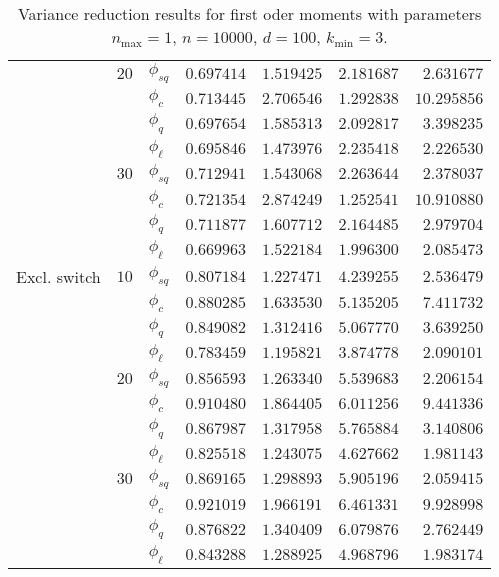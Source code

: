 \begin{table}[]
{\begin{tabular}{l@{\hskip 12pt}l@{\hskip 12pt}l@{\hskip 12pt}r@{\hskip 12pt}r@{\hskip 12pt}r@{\hskip 12pt}r}
            & $20$ &$\phi_{sq}$ &  $0.697414$ &  $1.519425$ &    $2.181687$ &   $2.631677$ \\
            &    &$\phi_{c}$ &  $0.713445$ &  $2.706546$ &    $1.292838$ &  $10.295856$ \\
            &    &$\phi_{q}$ &  $0.697654$ &  $1.585313$ &    $2.092817$ &   $3.398235$ \\
            &    & $\phi_{\ell}$ &  $0.695846$ &  $1.473976$ &    $2.235418$ &   $2.226530$ \\\cmidrule{2-7}
            & $30$ &$\phi_{sq}$ &  $0.712941$ &  $1.543068$ &    $2.263644$ &   $2.378037$ \\
            &    &$\phi_{c}$ &  $0.721354$ &  $2.874249$ &    $1.252541$ &  $10.910880$ \\
            &    &$\phi_{q}$ &  $0.711877$ &  $1.607712$ &    $2.164485$ &   $2.979704$ \\
            &    & $\phi_{\ell}$ &  $0.669963$ &  $1.522184$ &    $1.996300$ &   $2.085473$ \\\midrule
Excl. switch & $10$ &$\phi_{sq}$ &  $0.807184$ &  $1.227471$ &    $4.239255$ &   $2.536479$ \\
            &    &$\phi_{c}$ &  $0.880285$ &  $1.633530$ &    $5.135205$ &   $7.411732$ \\
            &    &$\phi_{q}$ &  $0.849082$ &  $1.312416$ &    $5.067770$ &   $3.639250$ \\
            &    & $\phi_{\ell}$ &  $0.783459$ &  $1.195821$ &    $3.874778$ &   $2.090101$ \\\cmidrule{2-7}
            & $20$ &$\phi_{sq}$ &  $0.856593$ &  $1.263340$ &    $5.539683$ &   $2.206154$ \\
            &    &$\phi_{c}$ &  $0.910480$ &  $1.864405$ &    $6.011256$ &   $9.441336$ \\
            &    &$\phi_{q}$ &  $0.867987$ &  $1.317958$ &    $5.765884$ &   $3.140806$ \\
            &    & $\phi_{\ell}$ &  $0.825518$ &  $1.243075$ &    $4.627662$ &   $1.981143$ \\\cmidrule{2-7}
            & $30$ &$\phi_{sq}$ &  $0.869165$ &  $1.298893$ &    $5.905196$ &   $2.059415$ \\
            &    &$\phi_{c}$ &  $0.921019$ &  $1.966191$ &    $6.461331$ &   $9.928998$ \\
            &    &$\phi_{q}$ &  $0.876822$ &  $1.340409$ &    $6.079876$ &   $2.762449$ \\
            &    & $\phi_{\ell}$ &  $0.843288$ &  $1.288925$ &    $4.968796$ &   $1.983174$ \\
\bottomrule
\end{tabular}}
    \caption[Variance reduction results for first oder moments]{Variance reduction results for first oder moments with parameters $n_{\max}=1$, $n=\num{10000}$, $d=100$, $k_{\min}=3$.}
    \label{tab:eff1}
\end{table}
